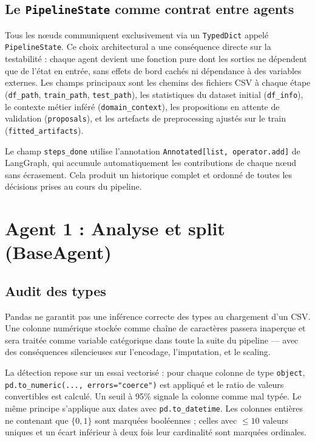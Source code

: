 \documentclass[12pt,a4paper]{article}
\begin{document}
\subsection{Le \texttt{PipelineState} comme contrat entre agents}

Tous les nœuds communiquent exclusivement via un \texttt{TypedDict} appelé
\texttt{PipelineState}. Ce choix architectural a une conséquence directe sur la
testabilité : chaque agent devient une fonction pure dont les sorties ne dépendent
que de l'état en entrée, sans effets de bord cachés ni dépendance à des variables
externes. Les champs principaux sont les chemins des fichiers CSV à chaque étape
(\texttt{df\_path}, \texttt{train\_path}, \texttt{test\_path}), les statistiques
du dataset initial (\texttt{df\_info}), le contexte métier inféré (\texttt{domain\_context}),
les propositions en attente de validation (\texttt{proposals}), et les artefacts de
preprocessing ajustés sur le train (\texttt{fitted\_artifacts}).

Le champ \texttt{steps\_done} utilise l'annotation \texttt{Annotated[list, operator.add]}
de LangGraph, qui accumule automatiquement les contributions de chaque nœud sans
écrasement. Cela produit un historique complet et ordonné de toutes les décisions
prises au cours du pipeline.

\section{Agent 1 : Analyse et split (BaseAgent)}

\subsection{Audit des types}

Pandas ne garantit pas une inférence correcte des types au chargement d'un CSV. Une
colonne numérique stockée comme chaîne de caractères passera inaperçue et sera traitée
comme variable catégorique dans toute la suite du pipeline --- avec des conséquences
silencieuses sur l'encodage, l'imputation, et le scaling.

La détection repose sur un essai vectorisé : pour chaque colonne de type \texttt{object},
\texttt{pd.to\_numeric(..., errors="coerce")} est appliqué et le ratio de valeurs
convertibles est calculé. Un seuil à 95\% signale la colonne comme mal typée.
Le même principe s'applique aux dates avec \texttt{pd.to\_datetime}. Les colonnes
entières ne contenant que $\{0, 1\}$ sont marquées booléennes ; celles avec $\leq 10$
valeurs uniques et un écart inférieur à deux fois leur cardinalité sont marquées
ordinales.
\end{document}
